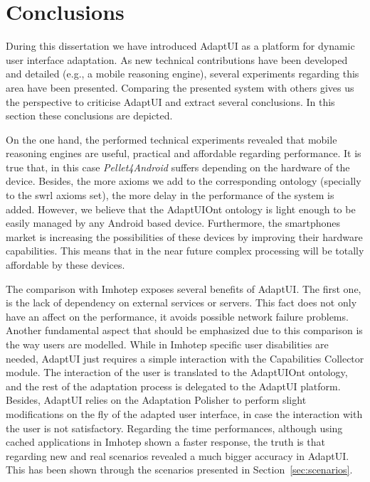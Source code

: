\section{Conclusions}
\label{sec:evaluation_conclusions}

During this dissertation we have introduced AdaptUI as a platform for dynamic
user interface adaptation. As new technical contributions have been developed 
and detailed (e.g., a mobile reasoning engine), several experiments regarding 
this area have been presented. Comparing the presented system with others gives
us the perspective to criticise AdaptUI and extract several conclusions. In this
section these conclusions are depicted.

On the one hand, the performed technical experiments revealed that mobile 
reasoning engines are useful, practical and affordable regarding performance. It
is true that, in this case \textit{Pellet4Android} suffers depending on the 
hardware of the device. Besides, the more axioms we add to the corresponding 
ontology (specially to the \ac{swrl} axioms set), the more delay in the performance 
of the system is added. However, we believe that the AdaptUIOnt ontology is 
light enough to be easily managed by any Android based device. Furthermore, the 
smartphones market is increasing the possibilities of these devices by 
improving their hardware capabilities. This means that in the near future 
complex processing will be totally affordable by these devices. 

The comparison with Imhotep exposes several benefits of AdaptUI. The first one, 
is the lack of dependency on external services or servers. This fact does not 
only have an affect on the performance, it avoids possible network failure 
problems. Another fundamental aspect that should be emphasized due to this 
comparison is the way users are modelled. While in Imhotep specific user 
disabilities are needed, AdaptUI just requires a simple interaction with the 
Capabilities Collector module. The interaction of the user is translated to the 
AdaptUIOnt ontology, and the rest of the adaptation process is delegated to the 
AdaptUI platform. Besides, AdaptUI relies on the Adaptation Polisher to perform
slight modifications on the fly of the adapted user interface, in case the 
interaction with the user is not satisfactory. Regarding the time 
performances, although using cached applications in Imhotep shown a faster 
response, the truth is that regarding new and real scenarios revealed a much 
bigger accuracy in AdaptUI. This has been shown through the scenarios presented 
in Section~\ref{sec:scenarios}.

